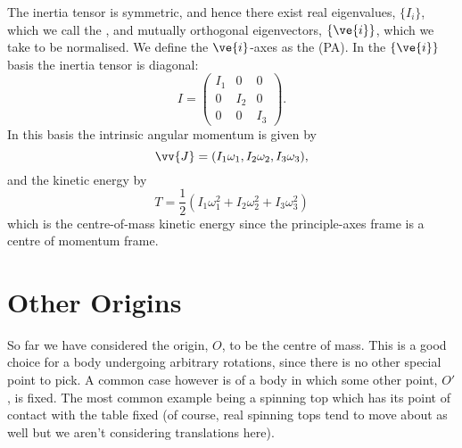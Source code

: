 \documentclass[fleqn]{NotesClass}
\begin{document}
    The inertia tensor is symmetric, and hence there exist real eigenvalues, \(\{I_i\}\), which we call the , and mutually orthogonal eigenvectors, \(\{\ve{i}\}\), which we take to be normalised.
    We define the \(\ve{i}\)-axes as the  (PA).
    In the \(\{\ve{i}\}\) basis the inertia tensor is diagonal:
    \begin{equation}
        I = 
        \begin{pmatrix}
            I_1 & 0 & 0\\
            0 & I_2 & 0\\
            0 & 0 & I_3
        \end{pmatrix}
        .
    \end{equation}
    In this basis the intrinsic angular momentum is given by
    \begin{equation}
        \vv{J} = (I_1\omega_1, I_2\omega_2, I_3\omega_3),
    \end{equation}
    and the kinetic energy by
    \begin{equation}
        T = \frac{1}{2}(I_1\omega_1^2 + I_2\omega_2^2 + I_3\omega_3^2)
    \end{equation}
    which is the centre-of-mass kinetic energy since the principle-axes frame is a centre of momentum frame.
    
    \section{Other Origins}
    So far we have considered the origin, \(O\), to be the centre of mass.
    This is a good choice for a body undergoing arbitrary rotations, since there is no other special point to pick.
    A common case however is of a body in which some other point, \(O'\), is fixed.
    The most common example being a spinning top which has its point of contact with the table fixed (of course, real spinning tops tend to move about as well but we aren't considering translations here).
    
\end{document}
